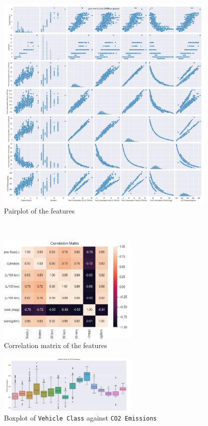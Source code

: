 \documentclass[12pt]{article}
\begin{document}
    \begin{figure}[h]
        \centering
        \includegraphics[width=0.95\textwidth]{./../Assets/pairplot.png}
        \caption{Pairplot of the features}
        \label{fig:pairplot}
    \end{figure}
    \vspace*{5pt} \\
    \begin{figure}[h]
        \centering
        \includegraphics[width=0.6\textwidth]{./../Assets/correlation.png}
        \caption{Correlation matrix of the features}
        \label{fig:correlation}
    \end{figure}
    \begin{figure}[h]
        \centering
        \includegraphics[width=0.6\textwidth]{./../Assets/box.png}
        \caption{Boxplot of \texttt{Vehicle Class} against \texttt{CO2 Emissions}}
        \label{fig:box}
    \end{figure}
\end{document}
